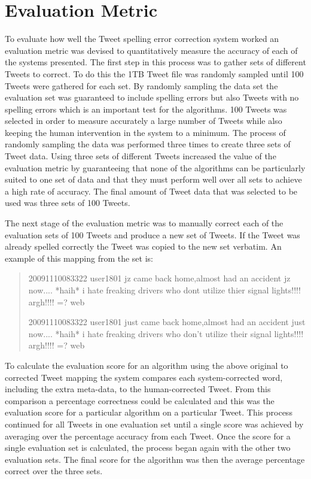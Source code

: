 \section{Evaluation Metric}
\label{eval}
To evaluate how well the Tweet spelling error correction system worked an evaluation metric was devised to quantitatively measure the accuracy of each of the systems presented. The first step in this process was to gather sets of different Tweets to correct. To do this the 1TB Tweet file was randomly sampled until 100 Tweets were gathered for each set. By randomly sampling the data set the evaluation set was guaranteed to include spelling errors but also Tweets with no spelling errors which is an important test for the algorithms. 100 Tweets was selected in order to measure accurately a large number of Tweets while also keeping the human intervention in the system to a minimum. The process of randomly sampling the data was performed three times to create three sets of Tweet data. Using three sets of different Tweets increased the value of the evaluation metric by guaranteeing that none of the algorithms can be particularly suited to one set of data and that they must perform well over all sets to achieve a high rate of accuracy. The final amount of Tweet data that was selected to be used was three sets of 100 Tweets.

The next stage of the evaluation metric was to manually correct each of the evaluation sets of 100 Tweets and produce a new set of Tweets. If the Tweet was already spelled correctly the Tweet was copied to the new set verbatim. An example of this mapping from the set is:

\begin{quote}
20091110083322 user1801 jz came back home,almost had an accident jz now.... *haih* i hate freaking drivers who dont utilize thier signal lights!!!! argh!!!! =? web

20091110083322 user1801 just came back home,almost had an accident just now.... *haih* i hate freaking drivers who don't utilize their signal lights!!!! argh!!!! =? web
\end{quote}

To calculate the evaluation score for an algorithm using the above original to corrected Tweet mapping the system compares each system-corrected word, including the extra meta-data, to the human-corrected Tweet. From this comparison a percentage correctness could be calculated and this was the evaluation score for a particular algorithm on a particular Tweet. This process continued for all Tweets in one evaluation set until a single score was achieved by averaging over the percentage accuracy from each Tweet. Once the score for a single evaluation set is calculated, the process began again with the other two evaluation sets. The final score for the algorithm was then the average percentage correct over the three sets.

